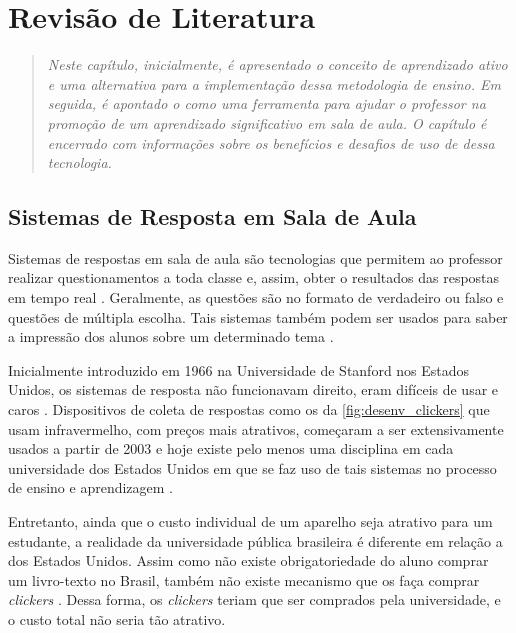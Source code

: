 \chapter{Revisão de Literatura}\label{chap:revision}

\begin{quote}\normalfont\itshape\vspace*{-2\baselineskip}
  Neste capítulo, inicialmente, é
  apresentado o conceito de aprendizado ativo e uma alternativa para a implementação dessa
  metodologia de ensino.
  Em seguida, é apontado o {\clicker} como uma
  ferramenta para ajudar o professor na promoção de um aprendizado significativo  em
  sala de aula. O capítulo é encerrado com informações sobre os benefícios e desafios de uso de dessa tecnologia.
\end{quote}


\section{Sistemas de Resposta em Sala de Aula}
\label{section:sistemas_de_resposta}

Sistemas de respostas em sala de aula são tecnologias que permitem ao professor
realizar questionamentos a toda classe e, assim, obter o resultados das respostas
em tempo real \cite{Kay2009}. Geralmente, as questões são no formato de verdadeiro ou
falso e questões de múltipla escolha. Tais sistemas também podem ser usados para
saber a impressão dos alunos sobre um determinado tema \cite{Fies2006}.

Inicialmente introduzido em 1966 na Universidade de Stanford nos Estados Unidos, os sistemas
de resposta não funcionavam direito, eram difíceis de usar e caros \cite{Kay2009}. Dispositivos
de coleta de respostas como os da \autoref{fig:desenv_clickers} que usam infravermelho, com preços mais
atrativos, começaram a ser extensivamente usados a partir de 2003 e hoje existe pelo menos
uma disciplina em cada universidade dos Estados Unidos em que se faz uso de tais sistemas
no processo de ensino e aprendizagem \cite{Abrahamson2014}.

Entretanto, ainda que o custo individual de um aparelho seja atrativo para um
estudante, a realidade da universidade pública brasileira é diferente em relação
a dos Estados Unidos. Assim como não existe obrigatoriedade do aluno comprar um
livro-texto no Brasil, também não existe mecanismo que os faça
comprar \textit{clickers} \cite{GerdKortemeyerEmersonCruz2011}. Dessa forma, os \textit{clickers}
teriam que ser comprados pela universidade, e o custo total não seria tão atrativo.

